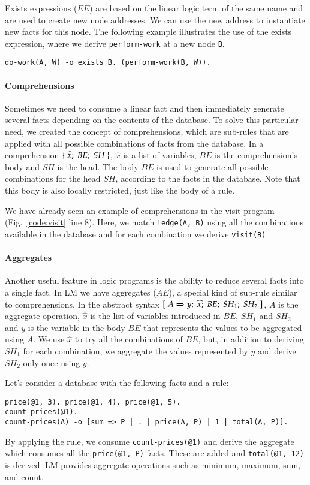 Exists expressions ($EE$) are based on the linear logic term of the same name and are used to create new node addresses.
We can use the new address to instantiate new facts for this node.  
The following example illustrates the use of the exists expression, where we derive
\texttt{perform-work} at a new node \texttt{B}.

\begin{Verbatim}
do-work(A, W) -o exists B. (perform-work(B, W)).
\end{Verbatim}

\paragraph{Comprehensions}

Sometimes we need to consume a linear fact and then immediately generate several facts depending on
the contents of the database. To solve this particular need, we created the concept of comprehensions, which are
sub-rules that are applied with all possible combinations of facts from the database. In a comprehension $\{ \; \widehat{x}; \; BE; \; SH \; \}$, $\widehat{x}$ is a list of variables, $BE$ is the comprehension's body and $SH$ is the head.
The body $BE$ is used to generate all possible combinations for the head $SH$, according to the facts
in the database. Note that this body is also locally restricted, just like the body of a rule. 

We have already seen an example of comprehensions in the visit program (Fig.~\ref{code:visit} line 8).
Here, we match \texttt{!edge(A, B)} using all the combinations available in the database and for each combination we derive \texttt{visit(B)}.

\paragraph{Aggregates}

Another useful feature in logic programs is the ability to reduce several facts into a single fact.
In LM we have aggregates ($AE$), a special kind of sub-rule similar to comprehensions.
In the abstract syntax $[\; A \Rightarrow y; \; \widehat{x}; \; BE; \; SH_1; \; SH_2 \;]$, $A$ is the aggregate operation, $\widehat{x}$ is the list of variables
introduced in $BE$, $SH_1$ and $SH_2$ and $y$ is the variable in the body
$BE$ that represents the values to be aggregated using $A$.
We use $\widehat{x}$ to try all the combinations of $BE$, but, in addition to deriving $SH_1$ for each combination,
we aggregate the values represented by $y$ and derive $SH_2$ only once using $y$.

Let's consider a database with the following facts and a rule:

\begin{Verbatim}
price(@1, 3). price(@1, 4). price(@1, 5).
count-prices(@1).
count-prices(A) -o [sum => P | . | price(A, P) | 1 | total(A, P)].
\end{Verbatim}

By applying the rule, we consume \texttt{count-prices(@1)} and
derive the aggregate which consumes all the \texttt{price(@1, P)} facts.
These are added and \texttt{total(@1,~12)} is derived.
LM provides aggregate operations such as minimum, maximum, sum, and count.
